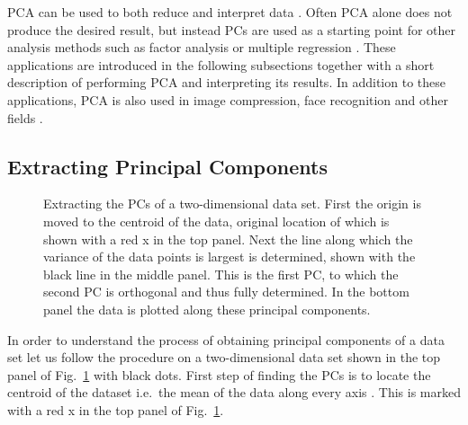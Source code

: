 \documentclass[english, oneside]{HYgradu}
\begin{document}
PCA can be used to both reduce and interpret data \citep{johnson2007applied}. Often PCA alone does not produce the desired result, but instead PCs are used as a starting point for other analysis methods such as factor analysis or multiple regression \citep{johnson2007applied}. These applications are introduced in the following subsections together with a short description of performing PCA and interpreting its results. In addition to  these applications, PCA is also used in image compression, face recognition and other fields \citep{smith2002tutorial}.

\subsection{Extracting Principal Components}
\begin{figure}
    \centering
    
    \caption{Extracting the PCs of a two-dimensional data set. First the origin is moved to the centroid of the data, original location of which is shown with a red x in the top panel. Next the line along which the variance of the data points is largest is determined, shown with the black line in the middle panel. This is the first PC, to which the second PC is orthogonal and thus fully determined. In the bottom panel the data is plotted along these principal components.
    }\label{fig:pca-illustrated}
\end{figure}

In order to understand the process of obtaining principal components of a data set let us follow the procedure on a two-dimensional data set shown in the top panel of Fig.\ \ref{fig:pca-illustrated} with black dots. First step of finding the PCs is to locate the centroid of the dataset i.e.\ the mean of the data along every axis \citep{smith2002tutorial}. This is marked with a red x in the top panel of Fig.\ \ref{fig:pca-illustrated}.
\end{document}
